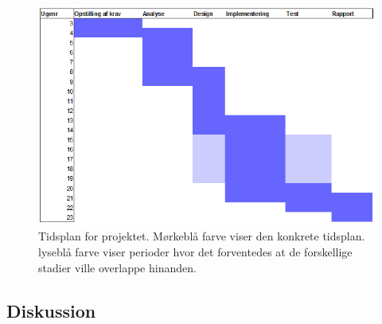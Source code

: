 \documentclass[rapport.tex]{subfiles}
\begin{document}
	\begin{figure}
	\centering
	\includegraphics[width=1\linewidth]{Tidsplan}
	\caption[Tidsplan for projektet]{Tidsplan for projektet. Mørkeblå farve viser den konkrete tidsplan. lyseblå farve viser perioder hvor det forventedes at de forskellige stadier ville overlappe hinanden.}
	\label{fig:Tidsplan}
	\end{figure}
	
	\subsection{Diskussion}
	
		
\end{document}

